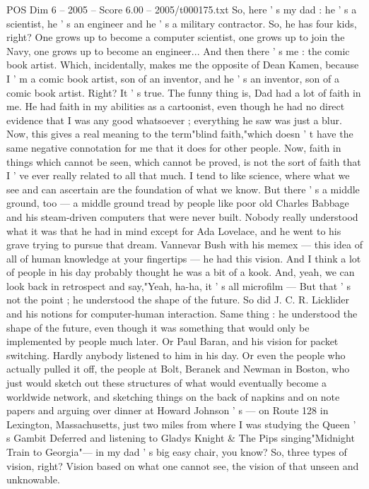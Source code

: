 \begin{textsample}{POS Dim 6 – 2005 – Score 6.00 – 2005/t000175.txt}
So, here ' s my dad : he ' s a scientist, he ' s an engineer and he ' s a military contractor.
So, he has four kids, right?
One grows up to become a computer scientist, one grows up to join the Navy, one grows up to become an engineer...
And then there ' s me : the comic book artist.
Which, incidentally, makes me the opposite of Dean Kamen, because I ' m a comic book artist, son of an inventor, and he ' s an inventor, son of a comic book artist.
Right?
It ' s true.
The funny thing is, Dad had a lot of faith in me.
He had faith in my abilities as a cartoonist, even though he had no direct evidence that I was any good whatsoever ; everything he saw was just a blur.
Now, this gives a real meaning to the term"blind faith,"which doesn ' t have the same negative connotation for me that it does for other people.
Now, faith in things which cannot be seen, which cannot be proved, is not the sort of faith that I ' ve ever really related to all that much.
I tend to like science, where what we see and can ascertain are the foundation of what we know.
But there ' s a middle ground, too — a middle ground tread by people like poor old Charles Babbage and his steam-driven computers that were never built.
Nobody really understood what it was that he had in mind except for Ada Lovelace, and he went to his grave trying to pursue that dream.
Vannevar Bush with his memex — this idea of all of human knowledge at your fingertips — he had this vision.
And I think a lot of people in his day probably thought he was a bit of a kook.
And, yeah, we can look back in retrospect and say,"Yeah, ha-ha, it ' s all microfilm — But that ' s not the point ; he understood the shape of the future.
So did J.
C.
R.
Licklider and his notions for computer-human interaction.
Same thing : he understood the shape of the future, even though it was something that would only be implemented by people much later.
Or Paul Baran, and his vision for packet switching.
Hardly anybody listened to him in his day.
Or even the people who actually pulled it off, the people at Bolt, Beranek and Newman in Boston, who just would sketch out these structures of what would eventually become a worldwide network, and sketching things on the back of napkins and on note papers and arguing over dinner at Howard Johnson ' s — on Route 128 in Lexington, Massachusetts, just two miles from where I was studying the Queen ' s Gambit Deferred and listening to Gladys Knight \& The Pips singing"Midnight Train to Georgia"— in my dad ' s big easy chair, you know?
So, three types of vision, right?
Vision based on what one cannot see, the vision of that unseen and unknowable.

\end{textsample}
